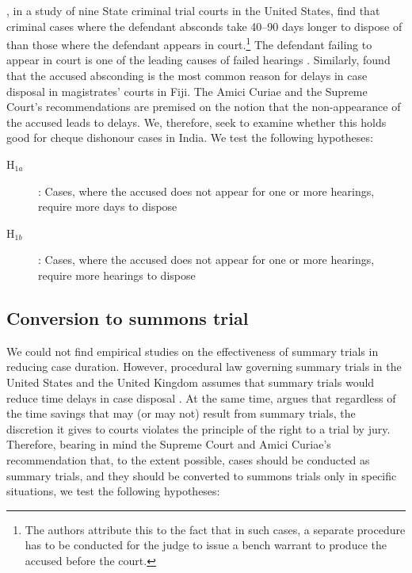 \documentclass[12pt,a4paper]{article}
\begin{document}
\textcite{ostrom2000efficiency}, in a study of nine State criminal trial courts in the United States, find that criminal cases where the defendant absconds take 40--90 days longer to dispose of than those where the defendant appears in court.\footnote{The authors attribute this to the fact that in such cases, a separate procedure has to be conducted for the judge to issue a bench warrant to produce the accused before the court.} The defendant failing to appear in court is one of the leading causes of failed hearings \autocite{crownProsecutionService2006_magistrateCourtEfficiency}. Similarly, \textcite{llangasinghe1988_fijiJudicialDelays} found that the accused absconding is the most common reason for delays in case disposal in magistrates' courts in Fiji. The Amici Curiae and the Supreme Court's recommendations are premised on the notion that the non-appearance of the accused leads to delays. We, therefore, seek to examine whether this holds good for cheque dishonour cases in India. We test the following hypotheses:

\begin{description}
\item[H$_{1a}$]: Cases, where the accused does not appear for one or more hearings, require more days to dispose
\item[H$_{1b}$]: Cases, where the accused does not appear for one or more hearings, require more hearings to dispose
\end{description}

\subsection{Conversion to summons trial}
\label{sec:conv-summ-trial}

We could not find empirical studies on the effectiveness of summary trials in reducing case duration. However, procedural law governing summary trials in the United States and the United Kingdom assumes that summary trials would reduce time delays in case disposal \autocite{miller2003}. At the same time, \textcite{miller2003} argues that regardless of the time savings that may (or may not) result from summary trials, the discretion it gives to courts violates the principle of the right to a trial by jury. Therefore, bearing in mind the Supreme Court and Amici Curiae's recommendation that, to the extent possible, cases should be conducted as summary trials, and they should be converted to summons trials only in specific situations, we test the following hypotheses:
\end{document}
